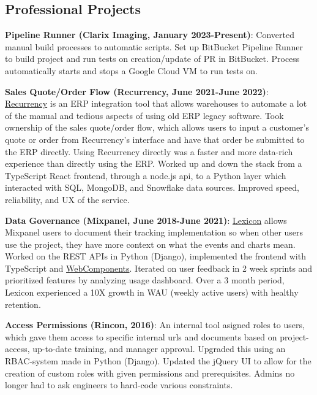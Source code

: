 \documentclass{res}
\begin{document}
\begin{resume}
  
  \section{Professional Projects}
   {\bf Pipeline Runner (Clarix Imaging, January 2023-Present)}:
  Converted manual build processes to automatic scripts. Set up BitBucket Pipeline Runner to build project
  and run tests on creation/update of PR in BitBucket. Process automatically starts and stops a Google Cloud VM
  to run tests on.
  
    {\bf Sales Quote/Order Flow (Recurrency, June 2021-June 2022)}:
  \href{https://www.recurrency.com/}{Recurrency} is an ERP integration tool that allows warehouses to automate
  a lot of the manual and tedious aspects of using old ERP legacy software. Took ownership of the sales quote/order
  flow, which allows users to input a customer's quote or order from Recurrency's interface and have that order be submitted
  to the ERP directly. Using Recurrency directly was a faster and more data-rich experience than directly using the ERP.
  Worked up and down the stack from a TypeScript React frontend, through a node.js api, to a Python layer which interacted with
  SQL, MongoDB, and Snowflake data sources. Improved speed, reliability, and UX of the service.
  
    {\bf Data Governance (Mixpanel, June 2018-June 2021)}:
  \href{https://help.mixpanel.com/hc/en-us/articles/360001307806-Lexicon-Overview}{Lexicon} allows Mixpanel 
  users to document their tracking implementation so when other users use the project, they have more
  context on what the events and charts mean. Worked on the REST APIs in Python (Django), implemented the
  frontend with TypeScript and \href{https://github.com/mixpanel/panel}{WebComponents}. Iterated on user
  feedback in 2 week sprints and prioritized features by analyzing usage dashboard. Over a 3 month period,
  Lexicon experienced a 10X growth in WAU (weekly active users) with healthy retention.
  
    {\bf Access Permissions (Rincon, 2016)}: An internal tool asigned roles to users, which gave them access
  to specific internal urls and documents based on project-access, up-to-date training, and manager approval.
  Upgraded this using an RBAC-system made in Python (Django). Updated the jQuery UI to allow for the creation
  of custom roles with given permissions and prerequisites. Admins no longer had to ask engineers to hard-code
  various constraints.
  
  

\end{resume}
\end{document}

